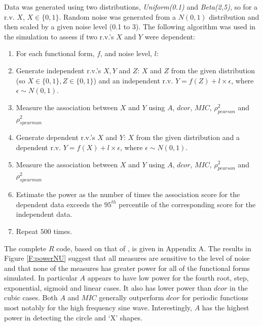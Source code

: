 \documentclass[a4paper, 12pt]{report}
\begin{document}
Data was generated using two  distributions, \textit{Uniform(0.1)} and \textit{Beta(2,5)}, so for a  r.v. $X$, $X \in \{0,1\}$. Random noise was generated from a $N(0,1)$ distribution and then scaled by a given noise level (0.1 to 3). The following algorithm was used in the simulation to assess if two r.v.'s $X$ and $Y$ were dependent:



 
\begin{enumerate}
\item For each functional form, $f$, and noise level, $l$:
\item Generate independent r.v.'s $X,Y$ and $Z$: $X$ and $Z$ from the given distribution (so $X \in \{0,1\}, Z \in \{0,1\}$) and an independent r.v. $Y=f(Z) + l \times \epsilon$, where $\epsilon \sim N(0,1)$.
\item Measure the association between $X$ and $Y$ using $A$, $dcor$, $MIC$, $\rho_{pearson}^2$ and $\rho_{spearman}^2$
\item Generate dependent r.v.'s $X$ and $Y$: $X$ from the given distribution and a dependent r.v. $Y=f(X) + l \times \epsilon$, where $\epsilon \sim N(0,1)$. 
\item Measure the association between $X$ and $Y$ using $A$, $dcor$, $MIC$, $\rho_{pearson}^2$ and $\rho_{spearman}^2$
\item Estimate the power as the number of times the association score for the dependent data exceeds the $95^{th}$ percentile of the corresponding score for the independent data.
\item Repeat $500$ times.
\end{enumerate}

The complete $R$ code, based on that of \citet{Tibshirani2011}, is given in Appendix A. The results in Figure \ref{F:powerNU} suggest that all measures are sensitive to the level of noise and that none of the measures has greater power for all of the functional forms simulated. In particular $A$ appears to have low power for the fourth root, step, exponential, sigmoid and linear cases. It also has lower power than $dcor$ in the cubic cases. Both $A$ and $MIC$ generally outperform $dcor$ for periodic functions most notably for the high frequency sine wave. Interestingly, $A$ has the highest power in detecting the circle and `X' shapes.
\end{document}
